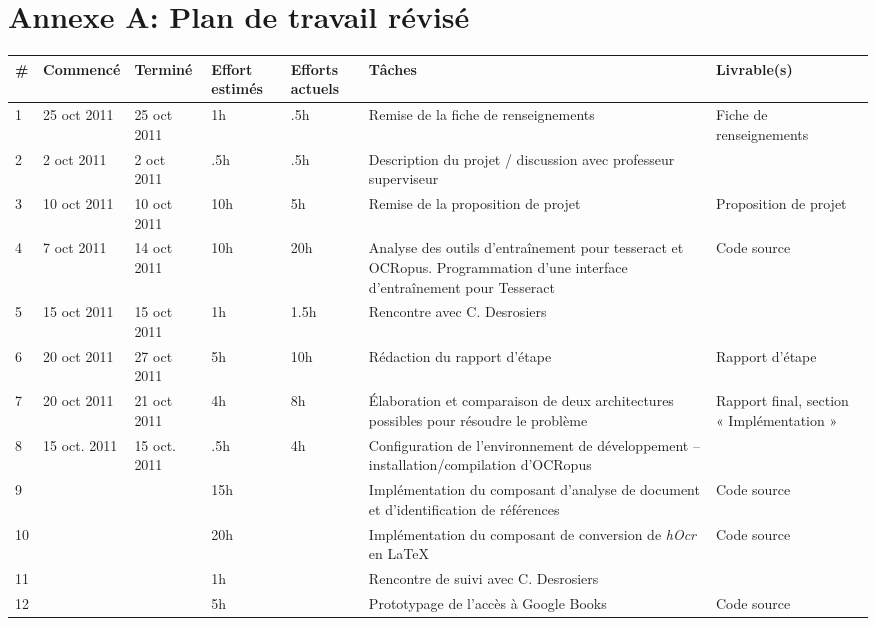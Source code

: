 \documentclass[12pt]{report}
\begin{document}
\section*{Annexe A: Plan de travail révisé}
\begin{table}
\begin{tabular}{| p{.5cm} | p{2cm} | p{2cm} | p{1.2cm} | p{1.5cm} | p{3.5cm} | p{3.5cm} |}
    \hline
    \rowcolor[gray]{0.9}
    \# & Commencé & Terminé & Effort estimés & Efforts actuels & Tâches & Livrable(s) \\
     \hline 
     1 & 25 oct 2011 & 25 oct 2011 & 1h & .5h & Remise de la fiche de renseignements & Fiche de renseignements \\
     \hline
     2 & 2 oct 2011 & 2 oct 2011 & .5h & .5h & Description du projet / discussion avec professeur superviseur &  \\
     \hline
     3 & 10 oct 2011 & 10 oct 2011 & 10h & 5h & Remise de la proposition de projet & Proposition de projet  \\
     \hline
     4 & 7 oct 2011 & 14 oct 2011 & 10h & 20h & Analyse des outils d'entraînement pour tesseract et OCRopus. Programmation d'une interface d'entraînement pour Tesseract & Code source \\
     \hline
     5 & 15 oct 2011 & 15 oct 2011 & 1h & 1.5h & Rencontre avec C. Desrosiers & \\
     \hline
     6 & 20 oct 2011 & 27 oct 2011 & 5h & 10h & Rédaction du rapport d'étape & Rapport d'étape \\
     \hline
     7 & 20 oct 2011 & 21 oct 2011 & 4h & 8h & Élaboration et comparaison de deux architectures possibles pour résoudre le problème & Rapport final, section « Implémentation » \\
     \hline
     8 & 15 oct. 2011 & 15 oct. 2011 & .5h & 4h & Configuration de l'environnement de développement -- installation/compilation d'OCRopus & \\
    \hline
     9 & & & 15h & & Implémentation du composant d'analyse de document et d'identification de références & Code source \\
    \hline
    10 & & & 20h & & Implémentation du composant de conversion de \emph{hOcr} en LaTeX & Code source \\
    \hline
    11 & & & 1h & & Rencontre de suivi avec C. Desrosiers &  \\
    \hline
    12 & & & 5h & & Prototypage de l'accès à Google Books & Code source \\

\end{tabular}
\end{table}
\end{document}
